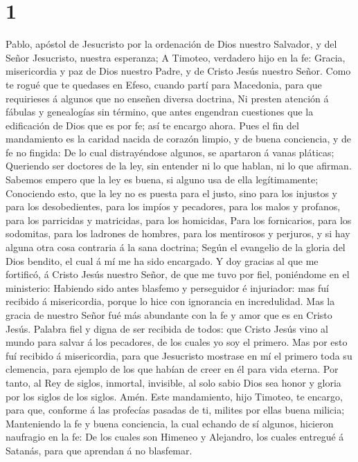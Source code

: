 \hypertarget{section}{%
\section{1}\label{section}}

 Pablo, apóstol de Jesucristo por la ordenación de Dios
nuestro Salvador, y del Señor Jesucristo, nuestra esperanza;
 A Timoteo, verdadero hijo en la fe: Gracia, misericordia
y paz de Dios nuestro Padre, y de Cristo Jesús nuestro Señor.
 Como te rogué que te quedases en Efeso, cuando partí para
Macedonia, para que requirieses á algunos que no enseñen diversa
doctrina,  Ni presten atención á fábulas y genealogías sin
término, que antes engendran cuestiones que la edificación de Dios que
es por fe; así te encargo ahora.  Pues el fin del
mandamiento es la caridad nacida de corazón limpio, y de buena
conciencia, y de fe no fingida:  De lo cual distrayéndose
algunos, se apartaron á vanas pláticas;  Queriendo ser
doctores de la ley, sin entender ni lo que hablan, ni lo que afirman.
 Sabemos empero que la ley es buena, si alguno usa de ella
legítimamente;  Conociendo esto, que la ley no es puesta
para el justo, sino para los injustos y para los desobedientes, para los
impíos y pecadores, para los malos y profanos, para los parricidas y
matricidas, para los homicidas,  Para los fornicarios,
para los sodomitas, para los ladrones de hombres, para los mentirosos y
perjuros, y si hay alguna otra cosa contraria á la sana doctrina;
 Según el evangelio de la gloria del Dios bendito, el
cual á mí me ha sido encargado.  Y doy gracias al que me
fortificó, á Cristo Jesús nuestro Señor, de que me tuvo por fiel,
poniéndome en el ministerio:  Habiendo sido antes
blasfemo y perseguidor é injuriador: mas fuí recibido á misericordia,
porque lo hice con ignorancia en incredulidad.  Mas la
gracia de nuestro Señor fué más abundante con la fe y amor que es en
Cristo Jesús.  Palabra fiel y digna de ser recibida de
todos: que Cristo Jesús vino al mundo para salvar á los pecadores, de
los cuales yo soy el primero.  Mas por esto fuí recibido
á misericordia, para que Jesucristo mostrase en mí el primero toda su
clemencia, para ejemplo de los que habían de creer en él para vida
eterna.  Por tanto, al Rey de siglos, inmortal,
invisible, al solo sabio Dios sea honor y gloria por los siglos de los
siglos. Amén.  Este mandamiento, hijo Timoteo, te
encargo, para que, conforme á las profecías pasadas de ti, milites por
ellas buena milicia;  Manteniendo la fe y buena
conciencia, la cual echando de sí algunos, hicieron naufragio en la fe:
 De los cuales son Himeneo y Alejandro, los cuales
entregué á Satanás, para que aprendan á no blasfemar.

